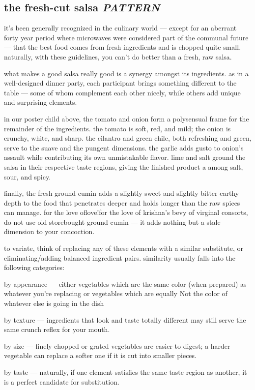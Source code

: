 \subsection{the fresh-cut salsa \textit{PATTERN}}

it's been generally recognized in the culinary world --- except for an
aberrant forty year period where microwaves were considered part of
the communal future --- that the best food comes from fresh
ingredients and is chopped quite small. naturally, with these
guidelines, you can't do better than a fresh, raw salsa.

what makes a good salsa really good is a synergy amongst its
ingredients. as in a well-designed dinner party, each participant
brings something different to the table --- some of whom complement
each other nicely, while others add unique and surprising elements.

in our poster child above, the tomato and onion form a polysensual
frame for the remainder of the ingredients. the tomato is soft, red,
and mild; the onion is crunchy, white, and sharp. the cilantro and
green chile, both refreshing and green, serve to  the suave and
the pungent dimensions. the garlic adds gusto to onion's assault while
contributing its own unmistakable flavor. lime and salt ground the
salsa in their respective taste regions, giving the finished product a
 among salt, sour, and spicy.

finally, the fresh ground cumin adds a slightly sweet and slightly
bitter earthy depth to the food that penetrates deeper and holds
longer than the raw spices can manage. for the love of{love!for the love of} krishna's bevy
of virginal consorts, do not use old storebought ground cumin --- it
adds nothing but a stale dimension to your concoction.

to variate, think of replacing any of these elements with a similar
substitute, or eliminating/adding balanced ingredient
pairs. similarity usually falls into the following categories:

\begin{ingredients}
  \item by appearance --- either vegetables which are the same color
  (when prepared) as whatever you're replacing or vegetables which are
  equally Not the color of whatever else is going in the dish

  \item by texture --- ingredients that look and taste totally
  different may still serve the same crunch reflex for your mouth.

  \item by size --- finely chopped or grated vegetables are easier to
  digest; a harder vegetable can replace a softer one if it is cut
  into smaller pieces.

  \item by taste --- naturally, if one element satisfies the same
  taste region as another, it is a perfect candidate for substitution.
\end{ingredients}

